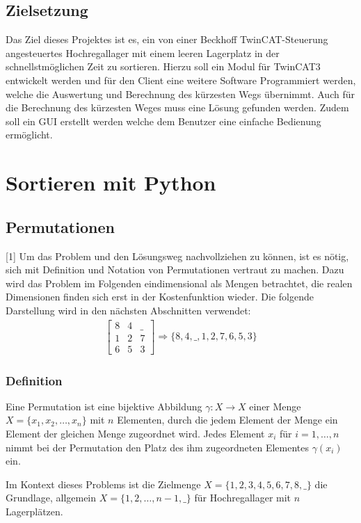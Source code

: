\documentclass{fh-ium-bama}
\begin{document}
\section{Zielsetzung}
Das Ziel dieses Projektes ist es, ein von einer Beckhoff TwinCAT-Steuerung angesteuertes Hochregallager mit einem leeren Lagerplatz in der schnellstmöglichen Zeit zu sortieren. Hierzu soll ein Modul für TwinCAT3 entwickelt werden und für den Client eine weitere Software Programmiert werden, welche die Auswertung und Berechnung des kürzesten Wegs übernimmt. Auch für die Berechnung des kürzesten Weges muss eine Lösung gefunden werden. Zudem soll ein GUI erstellt werden welche dem Benutzer eine einfache Bedienung ermöglicht.
\newpage
\chapter{Sortieren mit Python}
\section{Permutationen}
{[1]} Um das Problem und den Lösungsweg nachvollziehen zu können, ist es nötig, sich mit Definition und Notation von Permutationen vertraut zu machen. Dazu wird das Problem im Folgenden eindimensional als Mengen betrachtet, die realen Dimensionen finden sich erst in der Kostenfunktion wieder. Die folgende Darstellung wird in den nächsten Abschnitten verwendet:
\begin{gather*}
\begin{bmatrix}
	8 & 4 & \_ \\
	1 & 2 & 7 \\
	6 & 5 & 3
\end{bmatrix}
\Rightarrow
\{8, 4, \_, 1, 2, 7, 6, 5, 3\}
\end{gather*}

\subsection{Definition}
Eine Permutation ist eine bijektive Abbildung $\gamma: X \rightarrow X$ einer Menge $X = \{x_1,x_2,\dots,x_n\}$ mit $n$ Elementen, durch die jedem Element der Menge ein Element der gleichen Menge zugeordnet wird.
Jedes Element $x_i$ für $i = 1,\dots,n$ nimmt bei der Permutation den Platz des ihm zugeordneten Elementes $\gamma(x_i)$ ein.

Im Kontext dieses Problems ist die Zielmenge $X = \{1,2,3,4,5,6,7,8,\_\}$ die Grundlage, allgemein $X = \{1,2,\dots,n-1,\_\}$ für Hochregallager mit $n$ Lagerplätzen.
\end{document}
